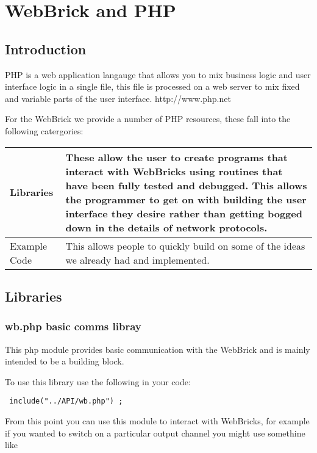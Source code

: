 \section{WebBrick and PHP}

\subsection{Introduction}

PHP is a web application langauge that allows you to mix business logic and user interface logic in a single file, this file
is processed on a web server to mix fixed and variable parts of the user interface. http://www.php.net

For the WebBrick we provide a number of PHP resources, these fall into the following catergories:

\begin{tabular}{l|p{12cm}}
    \hline
	Libraries&These allow the user to create programs that interact with WebBricks
				using routines that have been fully tested and debugged.  This allows
				the programmer to get on with building the user interface they desire rather
				than getting bogged down in the details of network protocols.\\
    \hline
	Example Code&This allows people to quickly build on some of the ideas we already had and
				implemented.\\
\end{tabular}

\subsection{Libraries}

\subsubsection{wb.php basic comms libray}

This php module provides basic communication with the WebBrick and is mainly intended to be a building block.

To use this library use the following in your code:

\begin{verbatim} include("../API/wb.php") ;\end{verbatim}

From this point you can use this module to interact with WebBricks, for example
if you wanted to switch on a particular output channel you might use
somethine like

